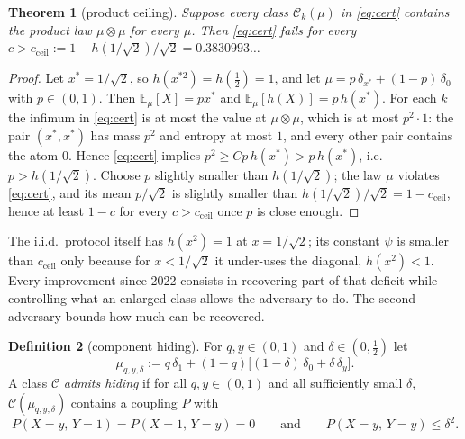 \documentclass[11pt,a4paper]{article}
\newtheorem{theorem}{Theorem}[section]
\theoremstyle{definition}
\newtheorem{definition}[theorem]{Definition}
\theoremstyle{remark}
\newcommand{\E}{\mathbb{E}}
\newcommand{\cC}{\mathcal{C}}
\newcommand{\ent}{h}
\begin{document}
\begin{theorem}[product ceiling]\label{thm:ceil}
Suppose every class $\cC_k(\mu)$ in \eqref{eq:cert} contains the product law $\mu\otimes\mu$ for every $\mu$. Then \eqref{eq:cert} fails for every $c>c_{\mathrm{ceil}}:=1-\ent(1/\sqrt2)/\sqrt2=0.3830993\ldots$
\end{theorem}
\begin{proof}
Let $x^*=1/\sqrt2$, so $\ent(x^{*2})=\ent(\tfrac12)=1$, and let $\mu=p\,\delta_{x^*}+(1-p)\,\delta_0$ with $p\in(0,1)$. Then $\E_\mu[X]=px^*$ and $\E_\mu[\ent(X)]=p\,\ent(x^*)$. For each $k$ the infimum in \eqref{eq:cert} is at most the value at $\mu\otimes\mu$, which is at most $p^2\cdot1$: the pair $(x^*,x^*)$ has mass $p^2$ and entropy at most $1$, and every other pair contains the atom $0$. Hence \eqref{eq:cert} implies $p^2\ge Cp\,\ent(x^*)>p\,\ent(x^*)$, i.e.\ $p>\ent(1/\sqrt2)$. Choose $p$ slightly smaller than $\ent(1/\sqrt2)$; the law $\mu$ violates \eqref{eq:cert}, and its mean $p/\sqrt2$ is slightly smaller than $\ent(1/\sqrt2)/\sqrt2=1-c_{\mathrm{ceil}}$, hence at least $1-c$ for every $c>c_{\mathrm{ceil}}$ once $p$ is close enough.
\end{proof}

The i.i.d.\ protocol itself has $\ent(x^2)=1$ at $x=1/\sqrt2$; its constant $\psi$ is smaller than $c_{\mathrm{ceil}}$ only because for $x<1/\sqrt2$ it under-uses the diagonal, $\ent(x^2)<1$. Every improvement since 2022 consists in recovering part of that deficit while controlling what an enlarged class allows the adversary to do. The second adversary bounds how much can be recovered.

\begin{definition}[component hiding]\label{def:hiding}
For $q,y\in(0,1)$ and $\delta\in(0,\tfrac12)$ let
\begin{equation}\label{eq:mudelta}
\mu_{q,y,\delta}:=q\,\delta_1+(1-q)\big[(1-\delta)\,\delta_0+\delta\,\delta_y\big].
\end{equation}
A class $\cC$ \emph{admits hiding} if for all $q,y\in(0,1)$ and all sufficiently small $\delta$, $\cC(\mu_{q,y,\delta})$ contains a coupling $P$ with
\[P(X=y,\,Y=1)=P(X=1,\,Y=y)=0\qquad\text{and}\qquad P(X=y,\,Y=y)\le\delta^2 .\]
\end{definition}
\end{document}
